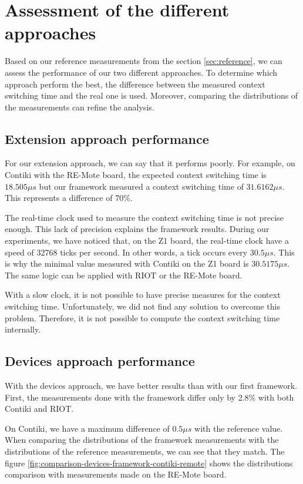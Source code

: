 \section{Assessment of the different approaches}

Based on our reference measurements from the section \ref{sec:reference}, we can assess the performance of our two different approaches.
To determine which approach perform the best, the difference between the measured context switching time and the real one is used.
Moreover, comparing the distributions of the measurements can refine the analysis.

\subsection{Extension approach performance}

For our extension approach, we can say that it performs poorly.
For example, on Contiki with the RE-Mote board, the expected context switching time is $18.505\mu s$ but our framework measured a context switching time of $31.6162\mu s$.
This represents a difference of $70\%$.

The real-time clock used to measure the context switching time is not precise enough.
This lack of precision explains the framework results.
During our experiments, we have noticed that, on the Z1 board, the real-time clock have a speed of 32768 ticks per second.
In other words, a tick occurs every $30.5\mu s$.
This is why the minimal value measured with Contiki on the Z1 board is $30.5175\mu s$.
The same logic can be applied with RIOT or the RE-Mote board.

With a slow clock, it is not possible to have precise measures for the context switching time.
Unfortunately, we did not find any solution to overcome this problem.
Therefore, it is not possible to compute the context switching time internally.

\subsection{Devices approach performance}

With the devices approach, we have better results than with our first framework.
First, the measurements done with the framework differ only by 2.8\% with both Contiki and RIOT.

On Contiki, we have a maximum difference of $0.5\mu s$ with the reference value.
When comparing the distributions of the framework measurements with the distributions of the reference measurements, we can see that they match.
The figure \ref{fig:comparison-devices-framework-contiki-remote} shows the distributions comparison with measurements made on the RE-Mote board.

